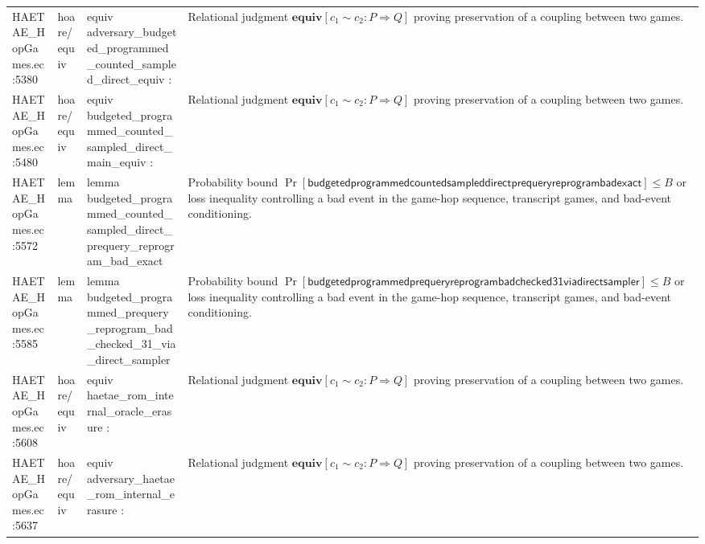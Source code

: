 \documentclass[10pt]{article}
\begin{document}
\begin{longtable}{L{0.11\textwidth}L{0.055\textwidth}L{0.385\textwidth}L{0.41\textwidth}}
HAETAE\_\allowbreak{}HopGames.\allowbreak{}ec:\allowbreak{}5380 & hoare/equiv & {\ttfamily\scriptsize equiv adversary\_\allowbreak{}budgeted\_\allowbreak{}programmed\_\allowbreak{}counted\_\allowbreak{}sampled\_\allowbreak{}direct\_\allowbreak{}equiv :} & Relational judgment $\mathbf{equiv}[c_1\sim c_2:P\Rightarrow Q]$ proving preservation of a coupling between two games. \\
HAETAE\_\allowbreak{}HopGames.\allowbreak{}ec:\allowbreak{}5480 & hoare/equiv & {\ttfamily\scriptsize equiv budgeted\_\allowbreak{}programmed\_\allowbreak{}counted\_\allowbreak{}sampled\_\allowbreak{}direct\_\allowbreak{}main\_\allowbreak{}equiv :} & Relational judgment $\mathbf{equiv}[c_1\sim c_2:P\Rightarrow Q]$ proving preservation of a coupling between two games. \\
HAETAE\_\allowbreak{}HopGames.\allowbreak{}ec:\allowbreak{}5572 & lemma & {\ttfamily\scriptsize lemma budgeted\_\allowbreak{}programmed\_\allowbreak{}counted\_\allowbreak{}sampled\_\allowbreak{}direct\_\allowbreak{}prequery\_\allowbreak{}reprogram\_\allowbreak{}bad\_\allowbreak{}exact} & Probability bound $\Pr[\mathsf{budgetedprogrammedcountedsampleddirectprequeryreprogrambadexact}]\le B$ or loss inequality controlling a bad event in the game-hop sequence, transcript games, and bad-event conditioning. \\
HAETAE\_\allowbreak{}HopGames.\allowbreak{}ec:\allowbreak{}5585 & lemma & {\ttfamily\scriptsize lemma budgeted\_\allowbreak{}programmed\_\allowbreak{}prequery\_\allowbreak{}reprogram\_\allowbreak{}bad\_\allowbreak{}checked\_\allowbreak{}31\_\allowbreak{}via\_\allowbreak{}direct\_\allowbreak{}sampler} & Probability bound $\Pr[\mathsf{budgetedprogrammedprequeryreprogrambadchecked31viadirectsampler}]\le B$ or loss inequality controlling a bad event in the game-hop sequence, transcript games, and bad-event conditioning. \\
HAETAE\_\allowbreak{}HopGames.\allowbreak{}ec:\allowbreak{}5608 & hoare/equiv & {\ttfamily\scriptsize equiv haetae\_\allowbreak{}rom\_\allowbreak{}internal\_\allowbreak{}oracle\_\allowbreak{}erasure :} & Relational judgment $\mathbf{equiv}[c_1\sim c_2:P\Rightarrow Q]$ proving preservation of a coupling between two games. \\
HAETAE\_\allowbreak{}HopGames.\allowbreak{}ec:\allowbreak{}5637 & hoare/equiv & {\ttfamily\scriptsize equiv adversary\_\allowbreak{}haetae\_\allowbreak{}rom\_\allowbreak{}internal\_\allowbreak{}erasure :} & Relational judgment $\mathbf{equiv}[c_1\sim c_2:P\Rightarrow Q]$ proving preservation of a coupling between two games. \\

\end{longtable}
\end{document}
